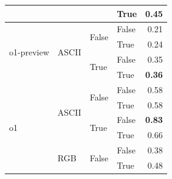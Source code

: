 \begin{tabular}{@{}llllr@{}}
                                                                        &                           &                           & True                      & \textbf{0.45} \\
    \midrule                                                                                                                                                   
    \multirow[c]{4}{*}{o1-preview}                                      & \multirow[c]{4}{*}{ASCII} & \multirow[c]{2}{*}{False} & False                     & 0.21 \\
                                                                        &                           &                           & True                      & 0.24 \\
                                                                        &                           & \multirow[c]{2}{*}{True}  & False                     & 0.35 \\
                                                                        &                           &                           & True                      & \textbf{0.36} \\
    \midrule                                                                                                                                                   
    \multirow[c]{8}{*}{o1}                                              & \multirow[c]{4}{*}{ASCII} & \multirow[c]{2}{*}{False} & False                     & 0.58 \\
                                                                        &                           &                           & True                      & 0.58 \\
                                                                        &                           & \multirow[c]{2}{*}{True}  & False                     & \textbf{0.83} \\
                                                                        &                           &                           & True                      & 0.66 \\
    \cmidrule{2-5}                                                                                                                                             
                                                                        & \multirow[c]{4}{*}{RGB}   & \multirow[c]{2}{*}{False} & False                     & 0.38 \\
                                                                        &                           &                           & True                      & 0.48 \\

\end{tabular}
